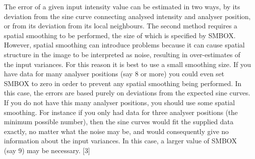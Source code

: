\documentclass[twoside,11pt]{starlink}
\begin{document}
{{{         The error of a given input intensity value can be estimated
         in two ways, by its deviation from the sine curve connecting
         analysed intensity and analyser position, or from its deviation
         from its local neighbours. The second method requires a spatial
         smoothing to be performed, the size of which is specified by
         SMBOX. However, spatial smoothing can introduce problems because
         it can cause spatial structure in the image to be interpreted as
         noise, resulting in over-estimates of the input variances. For
         this reason it is best to use a small smoothing size. If you
         have data for many analyser positions (say 8 or more) you could
         even set SMBOX to zero in order to prevent any spatial smoothing
         being performed. In this case, the errors are based purely on
         deviations from the expected sine curves. If you do not have
         this many analyser positions, you should use some spatial
         smoothing. For instance if you only had data for three analyser
         positions (the minimum possible number), then the sine curves
         would fit the supplied data exactly, no matter what the noise
         may be, and would consequently give no information about the input
         variances. In this case, a larger value of SMBOX (say 9) may be
         necessary. [3]
      }
      }}
\end{document}
